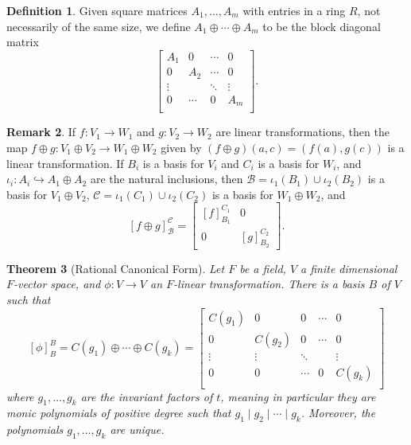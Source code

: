 \documentclass[12pt]{report}
\newtheorem{theorem}{Theorem}[chapter]
\numberwithin{equation}{section}
\numberwithin{theorem}{chapter}
\theoremstyle{definition}
\newtheorem{definition}[theorem]{Definition}
\newtheorem*{basic properties}{Basic Properties}
\newtheorem*{Important Remark}{Important Remark}
\newtheorem{remark}[theorem]{Remark}
\begin{document}
\begin{definition}
Given square matrices $A_1, \ldots, A_m$ with entries in a ring $R$, not necessarily of the same size, we define $A_1 \oplus \cdots \oplus A_m$ to be the block diagonal matrix 
$$\begin{bmatrix} 
A_1 & 0 & \cdots & 0 \\
0 & A_2 &  \cdots & 0 \\
\vdots & & \ddots & \vdots \\
0 & \cdots & 0 & A_m \\
\end{bmatrix}.$$
\end{definition}


\begin{remark}\label{remark RCF}
If $f:V_1\to W_1$ and $g:V_2\to W_2$ are linear transformations, then the map $f\oplus g:V_1\oplus V_2\to W_1\oplus W_2$ given by $(f\oplus g)(a,c)= (f(a),g(c))$ is a linear transformation. If $B_i$ is a basis for $V_i$ and $C_i$ is a basis for $W_i$, and $\iota_i: A_i \hookrightarrow A_1 \oplus A_2$ are the natural inclusions, then $\mathcal{B}=\iota_1(B_1)\cup \iota_2(B_2)$ is a basis for $V_1\oplus V_2$, $\mathcal{C}=\iota_1(C_1)\cup \iota_2(C_2)$ is a basis for $W_1\oplus W_2$, and
$$[f\oplus g]_{\mathcal{B}}^{\mathcal{C}}=
\begin{bmatrix}
[f]_{B_1}^{C_1} & 0 \\
0 & [g]_{B_2}^{C_2}
\end{bmatrix}.$$
\end{remark}


\begin{theorem}[Rational Canonical Form]\label{RCF}
Let $F$ be a field, $V$ a finite dimensional $F$-vector space, and $\phi \!: V \to V$ an $F$-linear transformation. There is a basis $B$ of $V$ such that 
$$[\phi]_B^B=C(g_1) \oplus \cdots \oplus C(g_k) =
\begin{bmatrix}
C(g_1) & 0 & 0 & \cdots & 0 \\
0 & C(g_2)  & 0 & \cdots & 0 \\
\vdots & \vdots & \ddots &  & \vdots \\
0 & 0 & \cdots & 0 & C(g_k) \\
\end{bmatrix}$$
where $g_1, \dots, g_k$ are the invariant factors of $t$, meaning in particular they are monic polynomials of positive degree such that $g_1 \mid g_2 \mid \cdots \mid g_k$. Moreover, the polynomials $g_1, \dots, g_k$ are unique.
\end{theorem}
\end{document}

